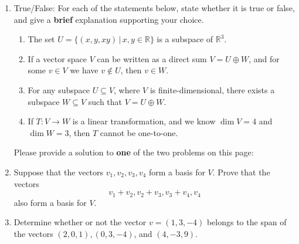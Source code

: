 \documentclass[12pt]{article}
\newcommand{\points}[1]{\marginpar{\hspace{24pt}[#1]}}
\newcommand{\R}{\mathbb{R}}
\begin{document}
\begin{enumerate}
\item True/False: For each of the statements below, state whether it is true or false, and give a {\bf brief} explanation supporting your choice.
 \begin{enumerate}
\item The set $U=\{(x,y,xy)\,|\,x,y\in\R\}$ is a subspace of $\R^3$.\points{3}

\vspace{1.6in}

\item If a vector space $V$ can be written as a direct sum $V=U\oplus W$, and for some $v\in V$ we have $v\notin U$, then $v\in W$.\points{3}

\vspace{1.6in}

\item For any subspace $U\subseteq V$, where $V$ is finite-dimensional, there exists a subspace $W\subseteq V$ such that $V=U\oplus W$.\points{3}

\vspace{1.6in}

\item If $T:V\to W$ is a linear transformation, and we know $\dim V=4$ and $\dim W=3$, then $T$ cannot be one-to-one.\points{3}

\end{enumerate}
\newpage
Please provide a solution to {\bf one} of the two problems on this page: 
\item Suppose that the vectors $v_1,v_2,v_3,v_4$ form a basis for $V$. Prove that the vectors \points{8}
\[
 v_1+v_2,v_2+v_3,v_3+v_4,v_4
\]
also form a basis for $V$.
\item Determine whether or not the vector $v=(1,3,-4)$ belongs to the span of the vectors $(2,0,1), (0,3,-4)$, and  $(4,-3,9)$. \points{8}


\end{enumerate}
\end{document}
